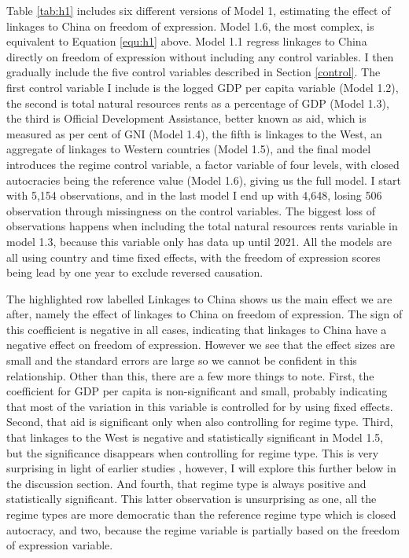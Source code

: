 Table \ref{tab:h1} includes six different versions of Model 1, estimating the effect of linkages to China on freedom of expression. Model 1.6, the most complex, is equivalent to Equation \ref{equ:h1} above. Model 1.1 regress linkages to China directly on freedom of expression without including any control variables. I then gradually include the five control variables described in Section \ref{control}. The first control variable I include is the logged GDP per capita variable (Model 1.2), the second is total natural resources rents as a percentage of GDP (Model 1.3), the third is Official Development Assistance, better known as aid, which is measured as per cent of GNI (Model 1.4), the fifth is linkages to the West, an aggregate of linkages to Western countries (Model 1.5), and the final model introduces the regime control variable, a factor variable of four levels, with closed autocracies being the reference value (Model 1.6), giving us the full model.  I start with 5,154 observations, and in the last model I end up with 4,648, losing 506 observation through missingness on the control variables. The biggest loss of observations happens when including the total natural resources rents variable in model 1.3, because this variable only has data up until 2021. All the models are all using country and time fixed effects, with the freedom of expression scores being lead by one year to exclude reversed causation. 

The highlighted row labelled Linkages to China shows us the main effect we are after, namely the effect of linkages to China on freedom of expression. The sign of this coefficient is negative in all cases, indicating that linkages to China have a negative effect on freedom of expression. However we see that the effect sizes are small and the standard errors are large so we cannot be confident in this relationship. Other than this, there are a few more things to note. First, the coefficient for GDP per capita is non-significant and small, probably indicating that most of the variation in this variable is controlled for by using fixed effects. Second, that aid is significant only when also controlling for regime type. Third, that linkages to the West is negative and statistically significant in Model 1.5, but the significance disappears when controlling for regime type. This is very surprising in light of earlier studies \citep{levitsky_linkage_2006}, however, I will explore this further below in the discussion section. And fourth, that regime type is always positive and statistically significant. This latter observation is unsurprising as one, all the regime types are more democratic than the reference regime type which is closed autocracy, and two, because the regime variable is partially based on the freedom of expression variable.

